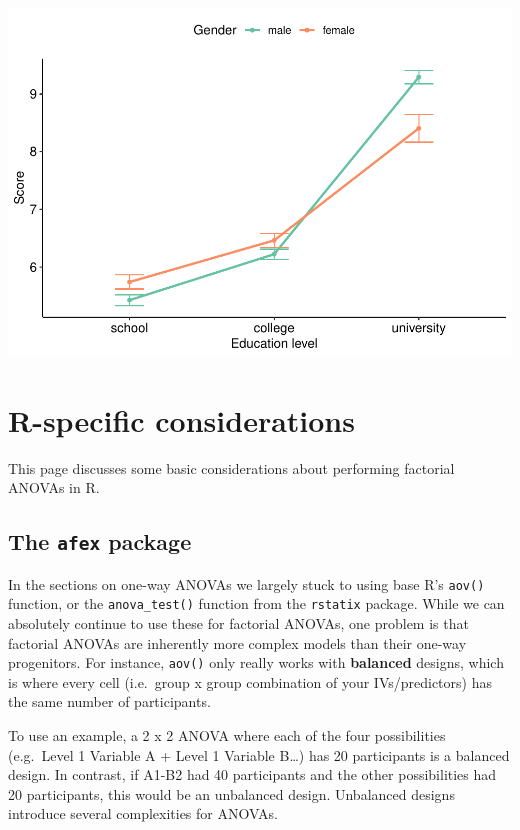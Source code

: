 \documentclass[
]{book}
\begin{document}
\includegraphics{_main_files/figure-latex/unnamed-chunk-234-1.pdf}

\section{R-specific considerations}\label{r-specific-considerations}

This page discusses some basic considerations about performing factorial ANOVAs in R.

\subsection{\texorpdfstring{The \texttt{afex} package}{The afex package}}\label{the-afex-package}

In the sections on one-way ANOVAs we largely stuck to using base R's \texttt{aov()} function, or the \texttt{anova\_test()} function from the \texttt{rstatix} package. While we can absolutely continue to use these for factorial ANOVAs, one problem is that factorial ANOVAs are inherently more complex models than their one-way progenitors. For instance, \texttt{aov()} only really works with \textbf{balanced} designs, which is where every cell (i.e.~group x group combination of your IVs/predictors) has the same number of participants.

To use an example, a 2 x 2 ANOVA where each of the four possibilities (e.g.~Level 1 Variable A + Level 1 Variable B\ldots) has 20 participants is a balanced design. In contrast, if A1-B2 had 40 participants and the other possibilities had 20 participants, this would be an unbalanced design. Unbalanced designs introduce several complexities for ANOVAs.
\end{document}

